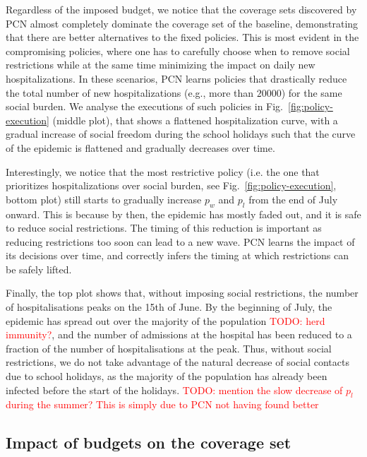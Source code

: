 \documentclass{article}
\newcommand\todo[1]{\textcolor{red}{TODO: #1}}
\begin{document}
Regardless of the imposed budget, we notice that the coverage sets discovered by PCN almost completely dominate the coverage set of the baseline, demonstrating that there are better alternatives to the fixed policies. This is most evident in the compromising policies, where one has to carefully choose when to remove social restrictions while at the same time minimizing the impact on daily new hospitalizations. In these scenarios, PCN learns policies that drastically reduce the total number of new hospitalizations (e.g., more than $20000$) for the same social burden. We analyse the executions of such policies in Fig.~\ref{fig:policy-execution} (middle plot), that shows a flattened hospitalization curve, with a gradual increase of social freedom during the school holidays such that the curve of the epidemic is flattened and gradually decreases over time.

Interestingly, we notice that the most restrictive policy (i.e. the one that prioritizes hospitalizations over social burden, see Fig.~\ref{fig:policy-execution}, bottom plot) still starts to gradually increase $p_w$ and $p_l$ from the end of July onward. This is because by then, the epidemic has mostly faded out, and it is safe to reduce social restrictions. The timing of this reduction is important as reducing restrictions too soon can lead to a new wave. PCN learns the impact of its decisions over time, and correctly infers the timing at which restrictions can be safely lifted.

Finally, the top plot shows that, without imposing social restrictions, the number of hospitalisations peaks on the 15th of June. By the beginning of July, the epidemic has spread out over the majority of the population \todo{herd immunity?}, and the number of admissions at the hospital has been reduced to a fraction of the number of hospitalisations at the peak. Thus, without social restrictions, we do not take advantage of the natural decrease of social contacts due to school holidays, as the majority of the population has already been infected before the start of the holidays. \todo{mention the slow decrease of $p_l$ during the summer? This is simply due to PCN not having found better}

\subsection{Impact of budgets on the coverage set}
\end{document}
